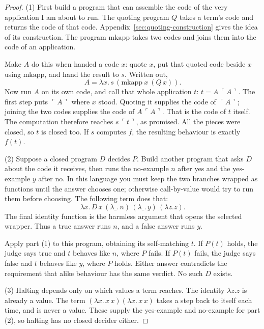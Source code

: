 \documentclass[11pt,twoside]{article}
\theoremstyle{thielethm}
\theoremstyle{thieledef}
\theoremstyle{thieledef}
\theoremstyle{thieledef}
\theoremstyle{thielethm}
\theoremstyle{thieleobs}
\theoremstyle{thielethm}
\begin{document}
\begin{proof}
(1) First build a program that can assemble the code of the very application
I am about to run. The quoting program $Q$ takes a term's code and returns
the code of that code. Appendix~\ref{sec:quoting-construction} gives the idea of its
construction. The program
$\mathrm{mkapp}$ takes two codes and joins them into the code of an application.

Make $A$ do this when handed a code $x$: quote $x$, put that quoted code
beside $x$ using $\mathrm{mkapp}$, and hand the result to $s$. Written out,
\[
 A=\lambda x.\,s\,(\mathrm{mkapp}\ x\ (Q\,x)).
\]
Now run $A$ on its own code, and call that whole application $t$:
$t=A\,\ulcorner A\urcorner$. The first step puts $\ulcorner A\urcorner$
where $x$ stood. Quoting it supplies the code of $\ulcorner A\urcorner$;
joining the two codes supplies the code of
$A\,\ulcorner A\urcorner$. That is the code of $t$ itself. The computation
therefore reaches $s\,\ulcorner t\urcorner$, as promised. All the pieces
were closed, so $t$ is closed too. If $s$ computes $f$, the resulting
behaviour is exactly $f(t)$.

(2) Suppose a closed program $D$ decides $P$. Build another program that asks
$D$ about the code it receives, then runs the no-example $n$ after yes and
the yes-example $y$ after no. In this language you must keep the two branches
wrapped as functions until the answer chooses one; otherwise call-by-value
would try to run them before choosing. The following term does that:
\[
 \lambda x.\,D\,x\,(\lambda\_.\,n)\,(\lambda\_.\,y)\,(\lambda z.z).
\]
The final identity function is the harmless argument that opens the selected
wrapper. Thus a true answer runs $n$, and a false answer runs $y$.

Apply part (1) to this program, obtaining its self-matching $t$. If $P(t)$
holds, the judge says true and $t$ behaves like $n$, where $P$ fails. If
$P(t)$ fails, the judge says false and $t$ behaves like $y$, where $P$ holds.
Either answer contradicts the requirement that alike behaviour has the same
verdict. No such $D$ exists.

(3) Halting depends only on which values a term reaches. The identity
$\lambda z.z$ is already a value. The term
$(\lambda x.\,x\,x)(\lambda x.\,x\,x)$ takes a step back to itself each
time, and is never a value. These supply the yes-example and no-example
for part (2), so halting has no closed decider either.
\end{proof}
\end{document}
